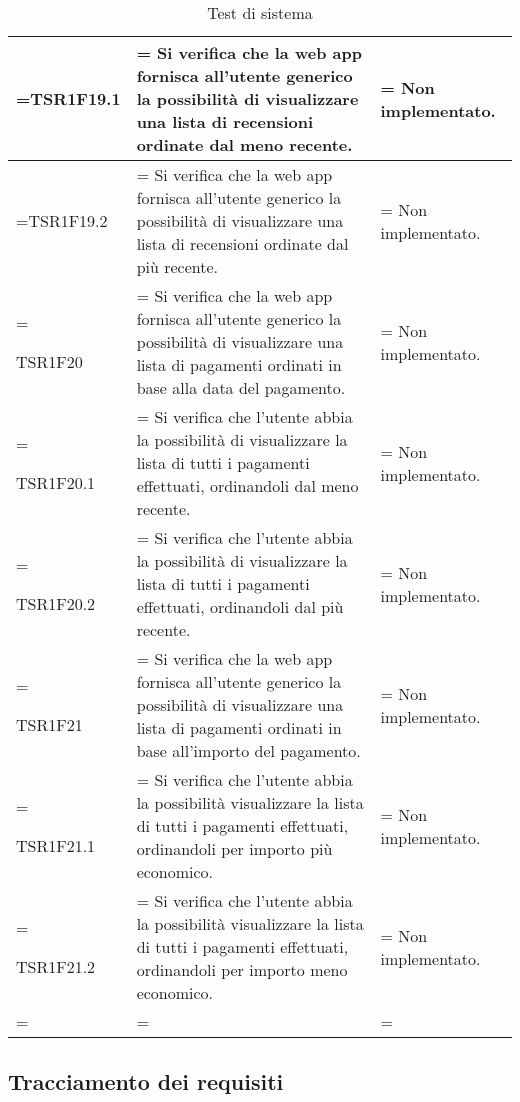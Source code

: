 \begin{xltabular}{\textwidth} {
            >{\hsize\linewidth=\hsize}X
            >{\hsize\linewidth=\hsize}X
            >{\hsize\linewidth=\hsize}X
        }
        TSR1F19.1 &
        Si verifica che la web app fornisca all'utente generico la possibilità di visualizzare una lista di recensioni ordinate dal meno recente. &
        Non implementato. 
        \\ \hline

        TSR1F19.2 &
        Si verifica che la web app fornisca all'utente generico la possibilità di visualizzare una lista di recensioni ordinate dal più recente. &
        Non implementato. 
        \\ \hline

        TSR1F20 &
        Si verifica che la web app fornisca all'utente generico la possibilità di visualizzare una lista di pagamenti ordinati in base alla data del pagamento. &
        Non implementato. 
        \\ \hline

        TSR1F20.1 &
        Si verifica che l'utente abbia la possibilità di visualizzare la lista di tutti i pagamenti
        effettuati, ordinandoli dal meno recente. &
        Non implementato.
        \\ \hline

        TSR1F20.2 &
        Si verifica che l'utente abbia la possibilità di visualizzare la lista di tutti i pagamenti
        effettuati, ordinandoli dal più recente. &
        Non implementato.
        \\ \hline

        TSR1F21 &
        Si verifica che la web app fornisca all'utente generico la possibilità di visualizzare una lista di pagamenti ordinati in base all'importo del pagamento. &
        Non implementato. 
        \\ \hline

        TSR1F21.1 &
        Si verifica che l'utente abbia la possibilità visualizzare la lista di tutti i pagamenti
        effettuati, ordinandoli per importo più economico. &
        Non implementato.
        \\ \hline
        
        TSR1F21.2 &
        Si verifica che l'utente abbia la possibilità visualizzare la lista di tutti i pagamenti
        effettuati, ordinandoli per importo meno economico. &
        Non implementato.
        \\ \hline


        \caption{Test di sistema}
    \end{xltabular}

    \subsection{Tracciamento dei requisiti}

